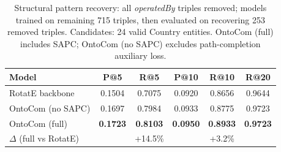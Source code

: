 
\begin{table}[h]
\centering
\caption{Structural pattern recovery: all \textit{operatedBy} triples removed;
models trained on remaining 715 triples, then evaluated on recovering 253 removed triples.
Candidates: 24 valid Country entities. OntoCom (full) includes SAPC; OntoCom (no SAPC)
excludes path-completion auxiliary loss.}
\label{tab:structural_recovery}
\begin{tabular}{lccccc}
\toprule
Model & P@5 & R@5 & P@10 & R@10 & R@20 \\
\midrule
RotatE backbone & 0.1504 & 0.7075 & 0.0920 & 0.8656 & 0.9644 \\
OntoCom (no SAPC) & 0.1697 & 0.7984 & 0.0933 & 0.8775 & 0.9723 \\
OntoCom (full) & \textbf{0.1723} & \textbf{0.8103} & \textbf{0.0950} & \textbf{0.8933} & \textbf{0.9723} \\
\midrule
\multicolumn{2}{l}{\footnotesize $\Delta$ (full vs RotatE)} &
  \footnotesize +14.5\% & & \footnotesize +3.2\% & \\
\bottomrule
\end{tabular}
\end{table}

